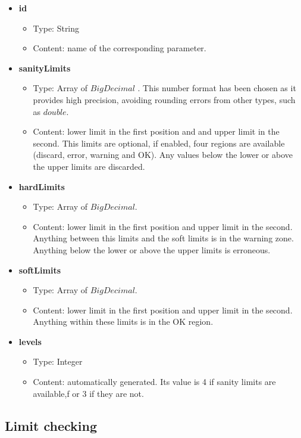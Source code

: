 \begin{itemize}
	\item \textbf{id}
		\begin{itemize}
			\item Type: String
			\item Content: name of the corresponding parameter.
		\end{itemize}
	\item \textbf{sanityLimits}
		\begin{itemize}
			\item Type: Array of $BigDecimal$ \cite{BigDecimal}. This number format has been chosen as it provides high precision, avoiding rounding errors from other types, such as $double$.
			\item Content: lower limit in the first position and and upper limit in the second. This limits are optional, if enabled, four regions are available (discard, error, warning and OK). Any values below the lower or above the upper limits are discarded.
		\end{itemize}
	\item \textbf{hardLimits}
		\begin{itemize}
			\item Type: Array of $BigDecimal$.
			\item Content: lower limit in the first position and upper limit in the second. Anything between this limits and the soft limits is in the warning zone. Anything below the lower or above the upper limits is erroneous.
		\end{itemize}
	\item \textbf{softLimits}
		\begin{itemize}
			\item Type: Array of $BigDecimal$.
			\item Content: lower limit in the first position and upper limit in the second. Anything within these limits is in the OK region.
		\end{itemize}
		
	\item \textbf{levels}
		\begin{itemize}
			\item Type: Integer
			\item Content: automatically generated. Its value is 4 if sanity limits are available,f or 3 if they are not.
		\end{itemize}
\end{itemize}
\pagebreak

\subsection{Limit checking}

